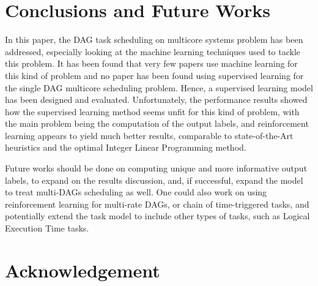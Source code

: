 \documentclass[conference]{IEEEtran}
\begin{document}









\section{Conclusions and Future Works}


In this paper, the DAG task scheduling on multicore systems problem
has been addressed, especially looking at the machine learning
techniques used to tackle this problem.
It has been found that very few papers use machine learning
for this kind of problem and no paper has been found using 
supervised learning for the single DAG multicore scheduling problem.
Hence, a supervised learning model has been designed and evaluated.
Unfortunately, the performance results 
showed how the supervised learning method seems unfit for this kind of 
problem, with the main problem being the computation of the output labels,
and reinforcement learning appears to yield much better results, comparable
to state-of-the-Art heuristics and the optimal Integer Linear Programming method.

Future works should be done on computing unique and more informative output labels,
to expand on the results discussion,
and, if successful, expand the model to treat multi-DAGs scheduling as well. 
One could also work on using reinforcement learning for 
multi-rate DAGs, or chain of time-triggered tasks, and potentially
extend the task model to include other types of tasks,
such as Logical Execution Time tasks.










\section*{Acknowledgement}





\end{document}
